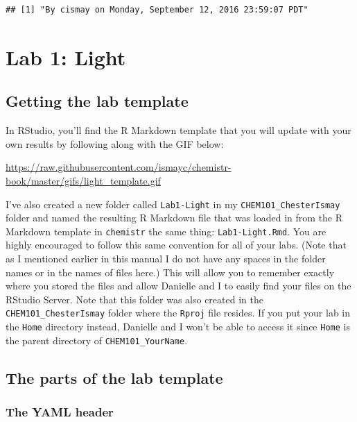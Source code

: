 \documentclass[]{tufte-book}
\begin{document}
\begin{verbatim}
## [1] "By cismay on Monday, September 12, 2016 23:59:07 PDT"
\end{verbatim}

\chapter{Lab 1: Light}\label{light}

\section{Getting the lab template}\label{getting-the-lab-template}

In RStudio, you'll find the R Markdown template that you will update
with your own results by following along with the GIF below:

\vspace{0.1in}

\begin{center}\footnotesize{\url{https://raw.githubusercontent.com/ismayc/chemistr-book/master/gifs/light_template.gif}}\end{center}

\vspace{0.1in}

I've also created a new folder called \texttt{Lab1-Light} in my
\texttt{CHEM101\_ChesterIsmay} folder and named the resulting R Markdown
file that was loaded in from the R Markdown template in
\texttt{chemistr} the same thing: \texttt{Lab1-Light.Rmd}. You are
highly encouraged to follow this same convention for all of your labs.
(Note that as I mentioned earlier in this manual I do not have any
spaces in the folder names or in the names of files here.) This will
allow you to remember exactly where you stored the files and allow
Danielle and I to easily find your files on the RStudio Server. Note
that this folder was also created in the \texttt{CHEM101\_ChesterIsmay}
folder where the \texttt{Rproj} file resides. If you put your lab in the
\texttt{Home} directory instead, Danielle and I won't be able to access
it since \texttt{Home} is the parent directory of
\texttt{CHEM101\_YourName}.

\section{The parts of the lab
template}\label{the-parts-of-the-lab-template}

\subsection{The YAML header}\label{the-yaml-header}
\end{document}
